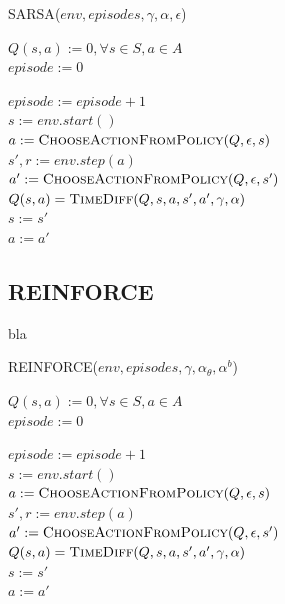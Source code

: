 \documentclass[letterpaper]{article}
\begin{document}
\linesnumbered
\dontprintsemicolon
\begin{algorithm}[t!]
{
	\caption{\textsc{SARSA}($ env, episodes, \gamma, \alpha, \epsilon $)}
	\label{alg:sarsa}
    $Q(s,a) := 0, \forall s \in S, a \in A $\\
    $episode := 0$

    {
      $episode := episode + 1$\\  
      $s := env.start()$\\
      $a := \textsc{ChooseActionFromPolicy}(Q, \epsilon, s) $\\

      {
        $s', r := env.step(a)$\\
        $a' := \textsc{ChooseActionFromPolicy}(Q, \epsilon, s') $\\
        $Q(s, a) = \textsc{TimeDiff}(Q, s, a, s', a', \gamma, \alpha)$\\
        $s := s'$ \\
        $a := a'$ \\
      }
    }

}
\end{algorithm}


\subsection{REINFORCE}

bla

\linesnumbered
\dontprintsemicolon
\begin{algorithm}[t!]
{
	\caption{\textsc{REINFORCE}($ env, episodes, \gamma, \alpha_{\theta}, \alpha^{b} $)}
	\label{alg:sarsa}
    $Q(s,a) := 0, \forall s \in S, a \in A $\\
    $episode := 0$

    {
      $episode := episode + 1$\\  
      $s := env.start()$\\
      $a := \textsc{ChooseActionFromPolicy}(Q, \epsilon, s) $\\

      {
        $s', r := env.step(a)$\\
        $a' := \textsc{ChooseActionFromPolicy}(Q, \epsilon, s') $\\
        $Q(s, a) = \textsc{TimeDiff}(Q, s, a, s', a', \gamma, \alpha)$\\
        $s := s'$ \\
        $a := a'$ \\
      }
    }

}
\end{algorithm}
\end{document}
